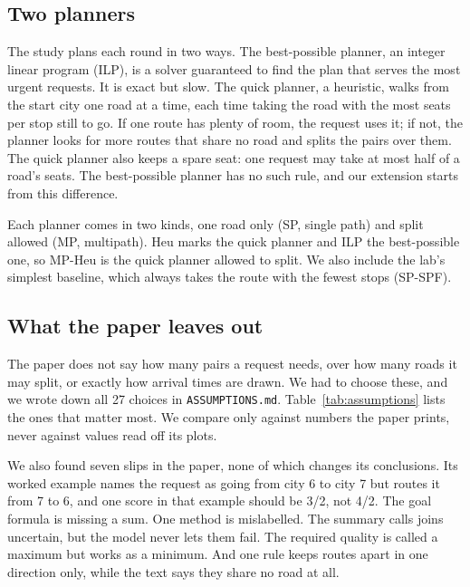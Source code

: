 \documentclass[conference]{IEEEtran}
\begin{document}
\subsection{Two planners}
The study plans each round in two ways. The best-possible planner, an integer linear program (ILP), is a solver guaranteed to find the plan that serves the most urgent requests. It is exact but slow. The quick planner, a heuristic, walks from the start city one road at a time, each time taking the road with the most seats per stop still to go. If one route has plenty of room, the request uses it; if not, the planner looks for more routes that share no road and splits the pairs over them. The quick planner also keeps a spare seat: one request may take at most half of a road's seats. The best-possible planner has no such rule, and our extension starts from this difference.

Each planner comes in two kinds, one road only (SP, single path) and split allowed (MP, multipath). Heu marks the quick planner and ILP the best-possible one, so MP-Heu is the quick planner allowed to split. We also include the lab's simplest baseline, which always takes the route with the fewest stops (SP-SPF).

\subsection{What the paper leaves out}
The paper does not say how many pairs a request needs, over how many roads it may split, or exactly how arrival times are drawn. We had to choose these, and we wrote down all 27 choices in \texttt{ASSUMPTIONS.md}. Table~\ref{tab:assumptions} lists the ones that matter most. We compare only against numbers the paper prints, never against values read off its plots.

We also found seven slips in the paper, none of which changes its conclusions. Its worked example names the request as going from city 6 to city 7 but routes it from 7 to 6, and one score in that example should be 3/2, not 4/2. The goal formula is missing a sum. One method is mislabelled. The summary calls joins uncertain, but the model never lets them fail. The required quality is called a maximum but works as a minimum. And one rule keeps routes apart in one direction only, while the text says they share no road at all.
\end{document}
